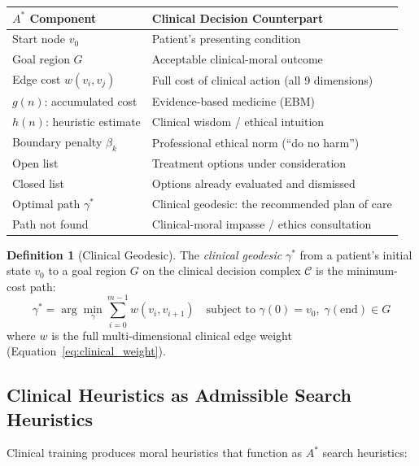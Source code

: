 \documentclass[12pt]{article}
\theoremstyle{definition}
\newtheorem{definition}[theorem]{Definition}
\theoremstyle{remark}
\newcommand{\C}{\mathcal{C}}               %
\begin{document}
\begin{center}
\begin{tabular}{ll}
\toprule
\textbf{$A^*$ Component} & \textbf{Clinical Decision Counterpart} \\
\midrule
Start node $v_0$ & Patient's presenting condition \\
Goal region $G$ & Acceptable clinical-moral outcome \\
Edge cost $w(v_i, v_j)$ & Full cost of clinical action (all 9 dimensions) \\
$g(n)$: accumulated cost & Evidence-based medicine (EBM) \\
$h(n)$: heuristic estimate & Clinical wisdom / ethical intuition \\
Boundary penalty $\beta_k$ & Professional ethical norm (``do no harm'') \\
Open list & Treatment options under consideration \\
Closed list & Options already evaluated and dismissed \\
Optimal path $\gamma^*$ & Clinical geodesic: the recommended plan of care \\
Path not found & Clinical-moral impasse / ethics consultation \\
\bottomrule
\end{tabular}
\end{center}

\begin{definition}[Clinical Geodesic]
\label{def:clinical_geodesic}
The \emph{clinical geodesic} $\gamma^*$ from a patient's initial state $v_0$ to a goal region $G$ on the clinical decision complex $\C$ is the minimum-cost path:
\begin{equation}
\gamma^* = \arg\min_\gamma \sum_{i=0}^{m-1} w(v_i, v_{i+1}) \quad \text{subject to } \gamma(0) = v_0,\; \gamma(\text{end}) \in G
\label{eq:clinical_geodesic}
\end{equation}
where $w$ is the full multi-dimensional clinical edge weight (Equation~\ref{eq:clinical_weight}).
\end{definition}

\subsection{Clinical Heuristics as Admissible Search Heuristics}

Clinical training produces moral heuristics that function as $A^*$ search heuristics:
\end{document}
